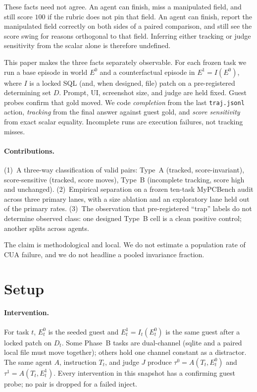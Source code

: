 \documentclass[11pt]{article}
\begin{document}
These facts need not agree. An agent can finish, miss a manipulated
field, and still score $100$ if the rubric does not pin that field. An
agent can finish, report the manipulated field correctly on both sides
of a paired comparison, and still see the score swing for reasons
orthogonal to that field. Inferring either tracking or judge sensitivity
from the scalar alone is therefore undefined.

This paper makes the three facts separately observable. For each frozen
task we run a base episode in world $E^0$ and a counterfactual episode
in $E^1=I(E^0)$, where $I$ is a locked SQL (and, when designed, file)
patch on a pre-registered determining set $D$. Prompt, UI, screenshot
size, and judge are held fixed. Guest probes confirm that gold moved.
We code \emph{completion} from the last \texttt{traj.jsonl} action,
\emph{tracking} from the final answer against guest gold, and
\emph{score sensitivity} from exact scalar equality. Incomplete runs
are execution failures, not tracking misses.

\paragraph{Contributions.}
(1)~A three-way classification of valid pairs: Type~A (tracked,
score-invariant), score-sensitive (tracked, score moves), Type~B
(incomplete tracking, score high and unchanged).
(2)~Empirical separation on a frozen ten-task MyPCBench audit across
three primary lanes, with a size ablation and an exploratory lane held
out of the primary rates.
(3)~The observation that pre-registered ``trap'' labels do not determine
observed class: one designed Type~B cell is a clean positive control;
another splits across agents.

The claim is methodological and local. We do not estimate a population
rate of CUA failure, and we do not headline a pooled invariance fraction.

\section{Setup}
\label{sec:setup}

\paragraph{Intervention.}
For task $t$, $E_t^0$ is the seeded guest and $E_t^1=I_t(E_t^0)$ is the
same guest after a locked patch on $D_t$. Some Phase~B tasks are
dual-channel (sqlite and a paired local file must move together);
others hold one channel constant as a distractor. The same agent $A$,
instruction $T_t$, and judge $J$ produce $\tau^0=A(T_t,E_t^0)$ and
$\tau^1=A(T_t,E_t^1)$. Every intervention in this snapshot has a
confirming guest probe; no pair is dropped for a failed inject.
\end{document}
